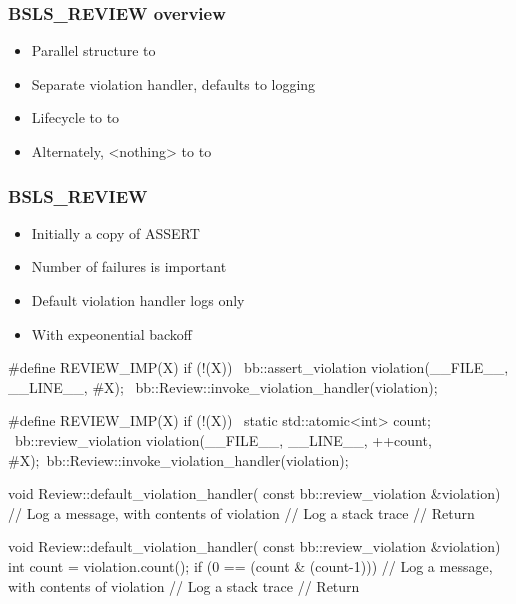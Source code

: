 \begin{frame}
  \frametitle{BSLS_REVIEW overview}

  \begin{itemize}
  \item Parallel structure to  \pause
  \item Separate violation handler, defaults to logging \pause
  \item Lifecycle  to  to  \pause
  \item Alternately, <nothing> to  to  
  \end{itemize}

\end{frame}

\begin{frame}[fragile]
  \frametitle{BSLS_REVIEW}

  \begin{itemize}
  \item<1->Initially a copy of ASSERT
  \item<2->Number of failures is important
  \item<3->Default violation handler logs only
  \item<4->With expeonential backoff
  \end{itemize}

  \begin{overprint}
\begin{cppcodebox}
#define REVIEW_IMP(X) if (!(X)) {                                   \
    bb::assert_violation violation(__FILE__, __LINE__, #X);         \
    bb::Review::invoke_violation_handler(violation);                \
}
\end{cppcodebox}
    
\begin{cppcodebox}
#define REVIEW_IMP(X) if (!(X)) {                                   \
    static std::atomic<int> count;                                  \
    bb::review_violation violation(__FILE__, __LINE__, ++count, #X);\
    bb::Review::invoke_violation_handler(violation);                \
}
\end{cppcodebox}

\onslide<3>
\begin{cppcodebox}
void Review::default_violation_handler(
                              const bb::review_violation &violation)
{
  // Log a message, with contents of violation
  // Log a stack trace
  // Return
}
\end{cppcodebox}

\begin{cppcodebox}
void Review::default_violation_handler(
                              const bb::review_violation &violation)
{
  int count = violation.count();
  if (0 == (count & (count-1))) {
    // Log a message, with contents of violation
    // Log a stack trace
  }
  // Return
}
\end{cppcodebox}
\end{overprint}

\end{frame}

